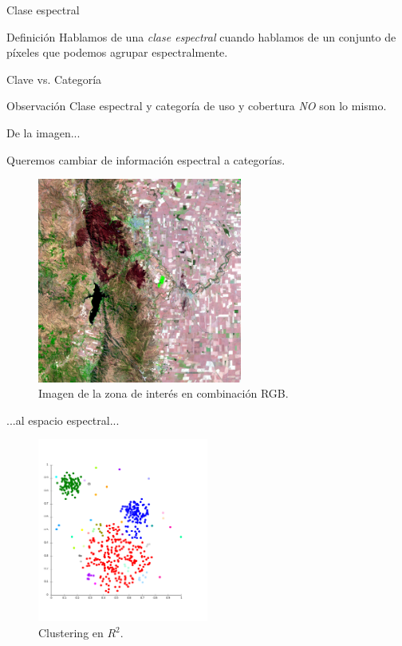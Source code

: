 \documentclass[]{beamer}
\begin{document}
\begin{frame}{Clase espectral}
  \begin{block}{Definición}
    Hablamos de una \emph{clase espectral} cuando hablamos de un conjunto de píxeles que podemos agrupar espectralmente.
  \end{block}
\end{frame}

\begin{frame}{Clave vs. Categoría}
  \begin{block}{Observación}
    Clase espectral y categoría de uso y cobertura \emph{NO} son lo mismo.
  \end{block}
\end{frame}

\begin{frame}{De la imagen...}

    Queremos cambiar de información espectral a categorías. \pause
    \begin{figure}
  \includegraphics[width=0.6\textwidth]{imagenes/imagen.png}
  \caption{Imagen de la zona de interés en combinación RGB.}
  \end{figure}
\end{frame}

\begin{frame}{...al espacio espectral...}
  \begin{figure}
    \includegraphics[width=0.5\textwidth]{imagenes/cluster.png}
    \caption{Clustering en $R^2$.}
  \end{figure}
\end{frame}
\end{document}
